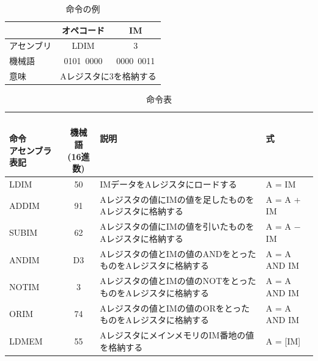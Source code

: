 \documentclass[11pt,b5paper,papersize,dvipdfmx]{jsbook}
\begin{document}
\begin{table}[htb]
    \centering
    \caption{命令の例}
    \begin{tabular}{lcc}
        \hline
        &{\small オペコード} &{\small IM}\\\hline
        {\small アセンブリ}&{\small LDIM}&{\small 3}\\
        {\small 機械語 }&{\small 0101\ 0000}&{\small 0000\ 0011}\\
        {\small 意味 }& \multicolumn{2}{c}{{\small Aレジスタに3を格納する}}  \\\hline
    \end{tabular}
    \label{tbl:meex}
\end{table}
%
\renewcommand{\arraystretch}{1.5}
\begin{table}[htb]\small
    \centering
    \caption{命令表}
    \begin{tabular}{lcll}%
        \hline
        \shortstack{\\命令\\{\scriptsize アセンブラ表記}} & \shortstack{\\機械語\\{\scriptsize (16進数)}} & \shortstack{説明\\\,} & \shortstack{式\\\,} \\
        \hline
        LDIM	&50	&{\scriptsize \parbox{23zw}{IMデータをAレジスタにロードする}}	                                         &A = IM\\
        ADDIM	&91	&{\scriptsize \parbox{23zw}{Aレジスタの値にIMの値を足したものをAレジスタに格納する}}	                       &A = A + IM\\
        SUBIM	&62	&{\scriptsize \parbox{23zw}{Aレジスタの値にIMの値を引いたものをAレジスタに格納する}}	                       &A = A $-$ IM\\
        ANDIM	&D3	&{\scriptsize \parbox{23zw}{Aレジスタの値とIMの値のANDをとったものをAレジスタに格納する}}	               &A = A AND IM\\
        NOTIM	&3	&{\scriptsize \parbox{23zw}{Aレジスタの値とIMの値のNOTをとったものをAレジスタに格納する}}	               &A = A AND IM\\
        ORIM	&74	&{\scriptsize \parbox{23zw}{Aレジスタの値とIMの値のORをとったものをAレジスタに格納する}}	                   &A = A AND IM\\
        LDMEM	&55	&{\scriptsize \parbox{23zw}{AレジスタにメインメモリのIM番地の値を格納する}}	                          &A = [IM]\\

\end{tabular}
\end{table}
\end{document}
